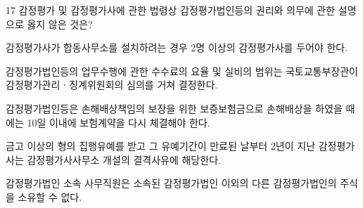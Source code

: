 \begin{question}{17}
감정평가 및 감정평가사에 관한 법령상 감정평가법인등의 권리와 의무에 관한 설명으로 옳지 않은 것은?
\begin{choices}
  \item 감정평가사가 합동사무소를 설치하려는 경우 2명 이상의 감정평가사를 두어야 한다.
  \item 감정평가법인등의 업무수행에 관한 수수료의 요율 및 실비의 범위는 국토교통부장관이 감정평가관리ㆍ징계위원회의 심의를 거쳐 결정한다.
  \item 감정평가법인등은 손해배상책임의 보장을 위한 보증보험금으로 손해배상을 하였을 때에는 10일 이내에 보험계약을 다시 체결해야 한다.
  \item 금고 이상의 형의 집행유예를 받고 그 유예기간이 만료된 날부터 2년이 지난 감정평가사는 감정평가사사무소 개설의 결격사유에 해당한다.
  \item 감정평가법인 소속 사무직원은 소속된 감정평가법인 이외의 다른 감정평가법인의 주식을 소유할 수 없다.
\end{choices}
\end{question}
